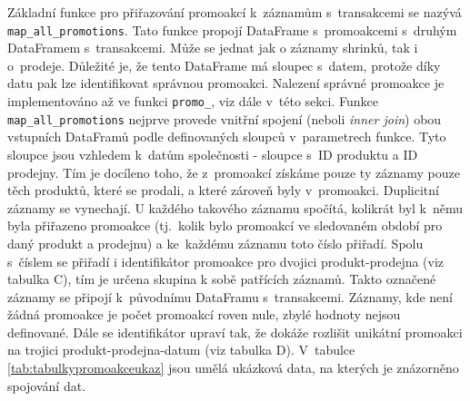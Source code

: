 Základní funkce pro přiřazování promoakcí k~záznamům s~transakcemi se nazývá \texttt{map\_all\_promotions}. Tato funkce propojí DataFrame s~promoakcemi s~druhým DataFramem s~transakcemi. Může se jednat jak o záznamy shrinků, tak i o~prodeje. Důležité je, že tento DataFrame má sloupec s~datem, protože díky datu pak lze identifikovat správnou promoakci. Nalezení správné promoakce je implementováno až ve funkci \texttt{promo\_}, viz dále v~této sekci. Funkce \texttt{map\_all\_promotions} nejprve provede vnitřní spojení (neboli \emph{inner join}) obou vstupních DataFramů podle definovaných sloupců v~parametrech funkce. Tyto sloupce jsou vzhledem k~datům společnosti - sloupce s~ID produktu a ID prodejny. Tím je docíleno toho, že z~promoakcí získáme pouze ty záznamy pouze těch produktů, které se prodali, a které zároveň byly v~promoakci. Duplicitní záznamy se vynechají. U každého takového záznamu spočítá, kolikrát byl k~němu byla přiřazeno promoakce (tj.~kolik bylo promoakcí ve sledovaném období pro daný produkt a prodejnu) a ke~každému záznamu toto číslo přiřadí. Spolu s~číslem se přiřadí i identifikátor promoakce pro dvojici produkt-prodejna (viz tabulka C), tím je určena skupina k sobě patřících záznamů. Takto označené záznamy se připojí k~původnímu DataFramu s~transakcemi. Záznamy, kde není žádná promoakce je počet promoakcí roven nule, zbylé hodnoty nejsou definované.
Dále se identifikátor upraví tak, že dokáže rozlišit unikátní promoakci na trojici produkt-prodejna-datum (viz tabulka D). V~tabulce \ref*{tab:tabulkypromoakceukaz} jsou umělá ukázková data, na kterých je znázorněno spojování dat.

